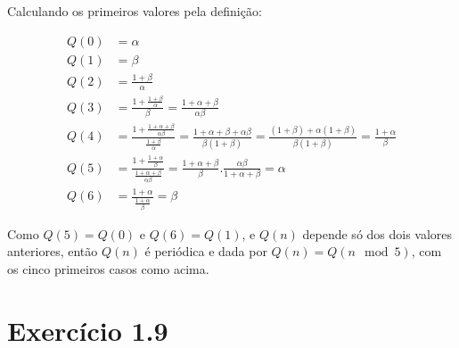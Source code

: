\documentclass[10pt]{book}
\begin{document}
Calculando os primeiros valores pela definição: 

\begin{align*}
 Q(0)&=\alpha \\
 Q(1)&=\beta \\
 Q(2)&=\frac{1+\beta}{\alpha}  \\
 Q(3)&=\frac{1+\frac{1+\beta}{\alpha}}{\beta}=\frac{1+\alpha+\beta}{\alpha\beta} \\
 Q(4)&=\frac{1+\frac{1+\alpha+\beta}{\alpha\beta}}{\frac{1+\beta}{\alpha}}=\frac{1+\alpha+\beta+\alpha\beta}{\beta(1+\beta)}=\frac{(1+\beta)+\alpha(1+\beta)}{\beta(1+\beta)}=\frac{1+\alpha}{\beta}  \\
 Q(5)&=\frac{1+\frac{1+\alpha}{\beta}}{\frac{1+\alpha+\beta}{\alpha\beta}}=\frac{1+\alpha+\beta}{\beta}.\frac{\alpha\beta}{1+\alpha+\beta}=\alpha  \\
 Q(6)&=\frac{1+\alpha}{\frac{1+\alpha}{\beta}}=\beta 
\end{align*}

  Como $Q(5)=Q(0)$ e $Q(6)=Q(1)$, e $Q(n)$ depende só dos dois valores anteriores, então $Q(n)$ é periódica e dada por $Q(n)=Q(n \mod 5)$, com os cinco primeiros casos como acima. 

\section{  Exercício 1.9 }
\end{document}
